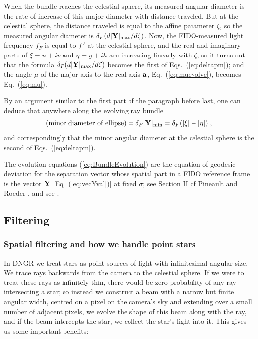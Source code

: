 \documentclass[12pt]{iopart}
\begin{document}
When the bundle reaches the celestial sphere, its measured
angular diameter is the rate of increase of this major diameter with 
distance traveled.  But at the celestial sphere, the distance traveled is equal to the affine
parameter $\zeta$, so the measured angular diameter is $\delta_F 
(d|{\bf Y}|_{\rm max}/d\zeta)$. Now, the FIDO-measured light frequency 
$f_F$ is equal to $f\,'$ at the celestial sphere, and the
real and imaginary parts of $\xi = u+iv$ and $\eta=g+ih$ are increasing linearly 
with $\zeta$, so it turns out that the formula $\delta_F (d|{\bf Y}|_{\rm max} /
d\zeta)$
becomes the first of Eqs.\ (\ref{eq:deltapm}); and the angle $\mu$ of the major axis 
to the real axis $\bf a$, Eq.\ (\ref{eq:muevolve}), becomes Eq.\ 
(\ref{eq:mu}).  

By an argument similar to the first part of the paragraph before last, one can 
deduce that anywhere along the evolving ray bundle 
\begin{equation}
\textrm{(minor diameter of ellipse)} = \delta_F |{\bf Y}|_{\rm min}
= \delta_F (|\xi|-|\eta|)\;,
\label{eq:majordiameter}
\end{equation}
and correspondingly that the minor angular diameter at the celestial sphere is
the second of Eqs.\ (\ref{eq:deltapm}). 

The evolution equations (\ref{eq:BundleEvolution}) are the equation of geodesic deviation for the
separation vector whose spatial part in a FIDO reference frame is the 
vector ${\bf Y}$ [Eq.\ (\ref{eq:vecYval})] at fixed $\sigma$; see Section II of Pineault and  Roeder \cite{PR2}, and see \cite{KipMathematica}.
\subsection{Filtering}
\label{subsec:App-Filtering}


\subsubsection{Spatial filtering and how we handle point stars}
\label{sec:PointStars}

In DNGR we treat stars as point sources of light with infinitesimal angular size. We trace rays backwards
from the camera to the celestial sphere.  If we were to treat these rays as infinitely thin,
there would be zero probability of any ray intersecting a star; so instead we construct a
beam with a narrow but finite angular width, centred on a pixel on the camera's sky and extending over a small number
of adjacent pixels,  we evolve the shape of this beam along with the ray, and if the beam intercepts the star, we collect the star's light into it.
This gives us some important benefits:
\end{document}
